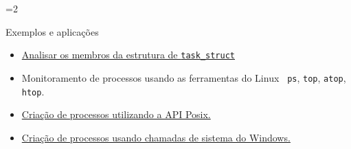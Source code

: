 
=2
\begin{frame}{Exemplos e aplicações}

  \begin{itemize}
    \item \href{http://lxr.linux.no/\#linux+v2.6.37.1/include/linux/sched.h\#L1182}{Analisar os membros da estrutura de {\tt task\_struct}}
  \item Monitoramento de processos usando as ferramentas do Linux {\tt
      ps}, {\tt top}, {\tt atop}, {\tt htop}.
  \item \href{http://adrianoholanda.org/edu/file.php/3/codigo_fonte/proc_cria_posix.c}{Criação
      de processos utilizando a API Posix.}
  \item \href{http://adrianoholanda.org/edu/file.php/3/codigo_fonte/proc_cria_win32.c}{Criação
      de processos usando chamadas de sistema do Windows.}
  \end{itemize}
  
\end{frame}
\fi
